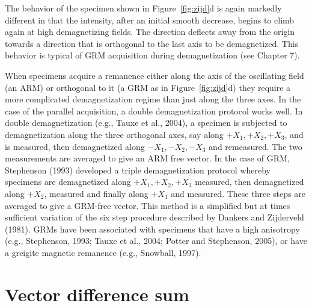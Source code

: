 The behavior  of the specimen shown in Figure~\ref{fig:zijd}d is again markedly different in that the intensity, after an initial smooth decrease, begins to climb again at high demagnetizing fields.  The direction deflects away from the origin towards  a direction that is orthogonal to the last axis to be demagnetized.  This behavior is typical of GRM acquisition during demagnetization (see Chapter 7).   

When specimens acquire a remanence either along the axis of the oscillating field (an ARM) or orthogonal to it (a GRM as in Figure~\ref{fig:zijd}d) they require a more complicated demagnetization regime than just along the three axes.  In the case of the parallel acquisition, a 
double demagnetization protocol works well.  In double demagnetization (e.g., 
\nocite{tauxe04}
Tauxe et al., 2004),   a specimen is subjected to demagnetization along the three orthogonal axes, say along $+X_1,+X_2,+X_3$,  and is measured, then demagnetized along $-X_1,-X_2,-X_3$ and remeasured.  The two measurements are averaged to give an ARM free vector.  In the case of GRM,  
Stephenson (1993) 
 \nocite{stephenson93} 
 developed a 
triple demagnetization protocol whereby specimens are  demagnetized along $+X_1,+X_2,+X_3$  measured,
then demagnetized along $+X_2$, measured and   finally along $+X_1$ and measured. These three steps are averaged to give a GRM-free vector.   This method is a simplified but at times sufficient variation of the six step procedure described by Dankers and Zijderveld (1981). \nocite{dankers81}   GRMs have been associated with specimens that have a high anisotropy (e.g., 
Stephenson, 1993; 
Tauxe et al., 2004; 
Potter and Stephenson, 2005),  or have a greigite magnetic remanence (e.g.,
\nocite{snowball97}
 Snowball, 1997).    





\section {Vector difference sum}
\label{sect:vds}
 
